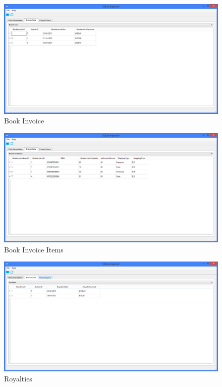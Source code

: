 \begin{figure}[H]
    \caption{Book Invoice} \label{fig:BookInvoice}
    \includegraphics[width=\textwidth]{./Maintenance/DatabaseTables/BookInvoice.png}
\end{figure}

\begin{figure}[H]
    \caption{Book Invoice Items} \label{fig:BookInvoiceItems}
    \includegraphics[width=\textwidth]{./Maintenance/DatabaseTables/BookInvoiceItems.png}
\end{figure}

\begin{figure}[H]
    \caption{Royalties} \label{fig:Royalties}
    \includegraphics[width=\textwidth]{./Maintenance/DatabaseTables/Royalties.png}
\end{figure}

